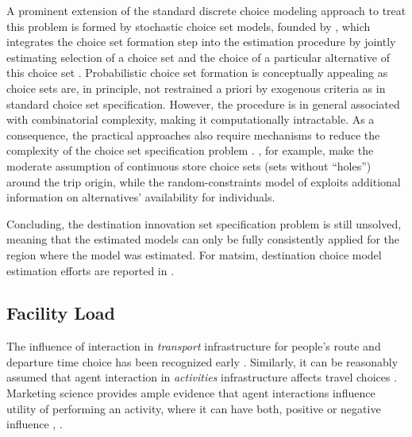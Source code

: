 A prominent extension of the standard discrete choice modeling approach to treat this problem is formed by stochastic choice set models, founded by \citet[][]{Manski_TD_1977, BurnettKPHanson_TRR_1979, BurnettKP_UG_1980}, which integrates the choice set formation step into the estimation procedure by jointly estimating selection of a choice set and the choice of a particular alternative of this choice set \citep[][]{KaplanEtAl_TRB_2009, PagliaraTimmermans_TransLett_2009, Manski_TD_1977, Swait_TransResPartB_2001, HorowitzLouviere_IJRM_1995, BenAkivaBoccara_IJRM_1995, SwaitBenAkiva_TransResPartB_1987, Swait_TransResPartB_2001, MartinezEtAl_TransResPartB_2009, CascettaPapola_TransResPartA_2009, BierlaireEtAl_2_STRC_2009, ScroginEtAl_TechRep_UCF_2004, ManraiAndrews_EJOR_1998, Ansah_TransRes_1977}.  
Probabilistic choice set formation is conceptually appealing as choice sets are, in principle, not restrained a priori by exogenous criteria as in standard choice set specification. 
However, the procedure is in general associated with combinatorial complexity, making it computationally intractable. 
As a consequence, the practical approaches also require mechanisms to reduce the complexity of the choice set specification problem \citep[e.g.,][p.11]{BenAkivaBoccara_IJRM_1995}. 
\citet[][]{ZhengJieGuo_TRB_2008}, for example, make the moderate assumption of continuous store choice sets (\ie sets without ``holes'') around the trip origin, while the random-constraints model of \citet[][]{BenAkivaBoccara_IJRM_1995} exploits additional information on alternatives' availability for individuals.

Concluding, the destination innovation set specification problem is still unsolved, meaning that the estimated models can only be fully consistently applied for the region where the model was estimated. 
For \gls{matsim}, 
destination choice model estimation efforts are reported in \citet[][Chapter 5]{Horni_PhDThesis_2013}.

\subsection{Facility Load}
\label{sec:facilityload}
The influence of interaction in \emph{transport} infrastructure for people's route and departure time choice has been recognized early \citep[e.g.,][]{Pigou_1920, Knight_QJE_1924, Wardrop_PICE_1952}. 
Similarly, it can be reasonably assumed that agent interaction in \emph{activities} infrastructure affects travel choices \citep[][]{Axhausen_SSRL_2006}. 
Marketing science provides ample evidence that agent interactions influence utility of performing an activity, where it can have both, positive or negative influence \citep[][p.331]{BakerJEtAl_JAMS_1994}, \citep[][]{ErogluAndHarrell_JR_1986, ErogluAndMachleit_JR_1990, ErogluEtAl_JBR_2005, HarrellEtAl_JMR_1980, HuiAndBateson_JCR_1991, PonsEtAl_PsychMark_2006}.


